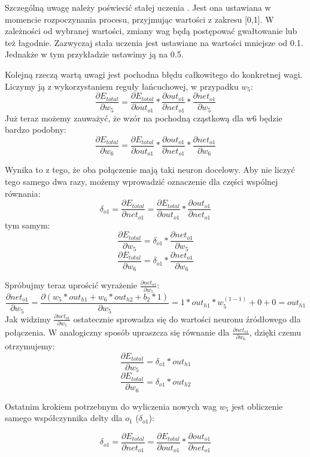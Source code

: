 Szczególną uwagę należy poświecić stałej uczenia \texteta.
Jest ona ustawiana w momencie rozpoczynania procesu, przyjmując wartości z zakresu [0,1].
W zależności od wybranej wartości, zmiany wag będą postępować gwałtowanie lub też łagodnie. 
Zazwyczaj stała uczenia jest ustawiane na wartości mniejsze od 0.1.
Jednakże w tym przykładzie ustawimy ją na 0.5.

Kolejną rzeczą wartą uwagi jest pochodna błędu całkowitego do konkretnej wagi.
Liczymy ją z wykorzystaniem reguły łańcuchowej, w przypadku \(w_5\):
\[
  \frac{\partial E_{total}}{\partial w_{5}} = \frac{\partial E_{total}}{\partial out_{o1}} * \frac{\partial out_{o1}}{\partial net_{o1}} * \frac{\partial net_{o1}}{\partial w_{5}}
\]
Już teraz możemy zauważyć, że wzór na pochodną cząstkową dla w6 będzie bardzo podobny:
\[
  \frac{\partial E_{total}}{\partial w_{6}} = \frac{\partial E_{total}}{\partial out_{o1}} * \frac{\partial out_{o1}}{\partial net_{o1}} * \frac{\partial net_{o1}}{\partial w_{6}}
\]

Wynika to z tego, że oba połączenie mają taki neuron docelowy.
Aby nie liczyć tego samego dwa razy, możemy wprowadzić oznaczenie dla części wspólnej równania:
\[
  \delta_{o1} = \frac{\partial E_{total}}{\partial net_{o1}} = \frac{\partial E_{total}}{\partial out_{o1}} * \frac{\partial out_{o1}}{\partial net_{o1}} 
\]
tym samym:
\[
  \frac{\partial E_{total}}{\partial w_{5}} = \delta_{o1}  * \frac{\partial net_{o1}}{\partial w_{5}}
\]
\[
  \frac{\partial E_{total}}{\partial w_{6}} = \delta_{o1}  * \frac{\partial net_{o1}}{\partial w_{6}}
\]

Spróbujmy teraz uprościć wyrażenie \(\frac{\partial net_{o1}}{\partial w_{5}}\):
\[
  \frac{\partial net_{o1}}{\partial w_{5}} = \frac{\partial (w_5 * out_{h1} + w_6 * out_{h2} + b_2 * 1)}{\partial w_{5}}
  = 1 * out_{h1} * w_5^{(1 - 1)} + 0 + 0 = out_{h1}
\]
Jak widzimy \(\frac{\partial net_{o1}}{\partial w_{5}}\) ostatecznie sprowadza się do wartości neuronu źródłowego dla połączenia.
W analogiczny sposób upraszcza się równanie dla \(\frac{\partial net_{o1}}{\partial w_{6}}\), dzięki czemu otrzymujemy:
\[
  \frac{\partial E_{total}}{\partial w_{5}} = \delta_{o1}  * out_{h1}
\]
\[
  \frac{\partial E_{total}}{\partial w_{6}} = \delta_{o1}  * out_{h2}
\]

Ostatnim krokiem potrzebnym do wyliczenia nowych wag \(w_5\) jest obliczenie samego współczynnika delty dla \(o_1\) (\(\delta_{o1}\)):

\[
  \delta_{o1} = \frac{\partial E_{total}}{\partial net_{o1}} = \frac{\partial E_{total}}{\partial out_{o1}} * \frac{\partial out_{o1}}{\partial net_{o1}}
\]

